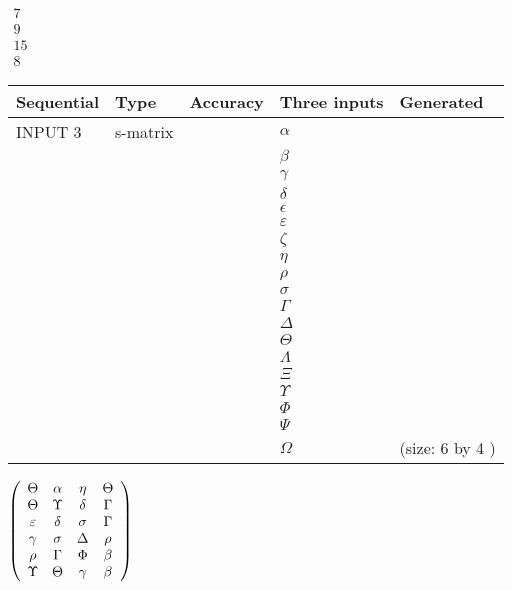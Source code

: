 \documentclass[12pt]{article}
\begin{document}
   
 $\begin{array}{
 c
 }
           7  \\ 
           9  \\ 
          15  \\ 
           8
\end{array}  $ 
  
  
\noindent\begin{tabular}{|l|l|l|l|l|}
\hline
 Sequential & Type & Accuracy & Three inputs & Generated \\ 
\hline
 
 
  INPUT $            3 $ & s-matrix & & 
 $  \alpha $ & 
  \\
  & & & 
 $  \beta $ & 
  \\
  & & & 
 $  \gamma $ & 
  \\
  & & & 
 $  \delta $ & 
  \\
  & & & 
 $  \epsilon $ & 
  \\
  & & & 
 $  \varepsilon $ & 
  \\
  & & & 
 $                     \zeta $ & 
  \\
  & & & 
 $  \eta $ & 
  \\
  & & & 
 $  \rho $ & 
  \\
  & & & 
 $  \sigma $ & 
  \\
  & & & 
 $  \Gamma $ & 
  \\
  & & & 
 $  \Delta $ & 
  \\
  & & & 
 $  \Theta $ & 
  \\
  & & & 
 $  \Lambda $ & 
  \\
  & & & 
 $                     \Xi $ & 
  \\
  & & & 
 $  \Upsilon $ & 
  \\
  & & & 
 $  \Phi $ & 
  \\
  & & & 
 $  \Psi $ & 
  \\
  & & & 
 $  \Omega $ & 
  (size:            6  by            4 )
 \\  \hline  
 \end{tabular}
   
   
 $  \left( \begin{array}
 {
 c
 c
 c
 c
 }
 \Theta & 
 \alpha & 
 \eta & 
 \Theta \\ 
 \Theta & 
 \Upsilon & 
 \delta & 
 \Gamma \\ 
 \varepsilon & 
 \delta & 
 \sigma & 
 \Gamma \\ 
 \gamma & 
 \sigma & 
 \Delta & 
 \rho \\ 
 \rho & 
 \Gamma & 
 \Phi & 
 \beta \\ 
 \Upsilon & 
 \Theta & 
 \gamma & 
 \beta
 \end{array} \right) $ 
  
\end{document}
